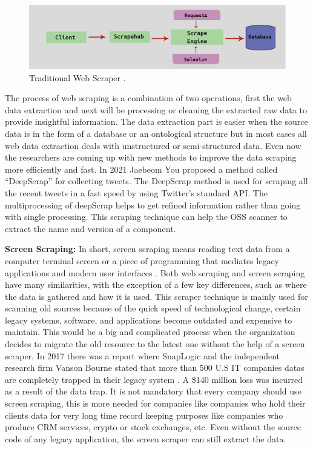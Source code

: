 \begin{figure}[h!]
	\includegraphics[width=15cm]{includes/webscraping.png}
	\centering
	\caption{ Traditional Web Scraper \cite{SaBa2016}.}
	\label{fig:webscraping}
\end{figure}
The process of web scraping is a combination of two operations, first the web data extraction and next will be processing or cleaning the extracted raw data to provide insightful information. The data extraction part is easier when the source data is in the form of a database or an ontological structure but in most cases all web data extraction deals with unstructured or semi-structured data. Even now the researchers are coming up with new methods to improve the data scraping more efficiently and fast. In 2021 Jaebeom You \cite{YoLeKw2021} proposed a method called “DeepScrap” for collecting tweets. The DeepScrap method is used for scraping all the recent tweets in a fast speed by using Twitter’s standard API. The multiprocessing of deepScrap helps to get refined information rather than going with single processing. This scraping technique can help the OSS scanner to extract the name and version of a component.

{\bf Screen Scraping:} In short, screen scraping means reading text data from a computer terminal screen or a piece of programming that mediates legacy applications and modern user interfaces \cite{Alex2021}. Both web scraping and screen scraping have many similarities, with the exception of a few key differences, such as where the data is gathered and how it is used. This scraper technique is mainly used for scanning old sources because of the quick speed of technological change, certain legacy systems, software, and applications become outdated and expensive to maintain. This would be a big and complicated process when the organization decides to migrate the old resource to the latest one without the help of a screen scraper. In 2017 there was a report where SnapLogic and the independent research firm Vanson Bourne stated that more than 500 U.S IT companies datas are completely trapped in their legacy system \cite{Snap}. A \$140 million loss was incurred as a result of the data trap. It is not mandatory that every company should use screen scraping, this is more needed for companies like companies who hold their clients data for very long time record keeping purposes like companies who produce CRM services, crypto or stock exchanges, etc. Even without the source code of any legacy application, the screen scraper can still extract the data. 
